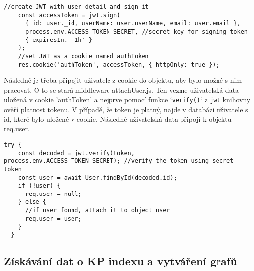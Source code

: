 \newpage
\begin{lstlisting}[caption = {Vytvoření JWT tokenu a jeho uložení do cookie},label = {lst:stranka}]
    //create JWT with user detail and sign it
    const accessToken = jwt.sign(
      { id: user._id, userName: user.userName, email: user.email },
      process.env.ACCESS_TOKEN_SECRET, //secret key for signing token
      { expiresIn: '1h' }
    );
    //set JWT as a cookie named authToken
    res.cookie('authToken', accessToken, { httpOnly: true });
\end{lstlisting}

\par Následně je třeba připojit uživatele z cookie do objektu, aby bylo možné s nim pracovat. O to se stará middleware attachUser.js. Ten vezme uživatelská data uložená v cookie 'authToken' a  nejprve pomocí funkce `\texttt{verify()}` z \texttt{jwt} knihovny ověří platnost tokenu. V případě, že token je platný, najde v databázi uživatele s id, které bylo uložené v cookie. Následně uživatelská data připojí k objektu req.user.
\begin{lstlisting}[caption = {Ověření JWT tokenu a připojení uživatele k objektu req.user},label = {lst:stranka}]
  try {
    const decoded = jwt.verify(token, process.env.ACCESS_TOKEN_SECRET); //verify the token using secret token
    const user = await User.findById(decoded.id); 
    if (!user) {
      req.user = null; 
    } else {
      //if user found, attach it to object user
      req.user = user; 
    }
  }
\end{lstlisting}


\subsection{Získávání dat o KP indexu a vytváření grafů}

